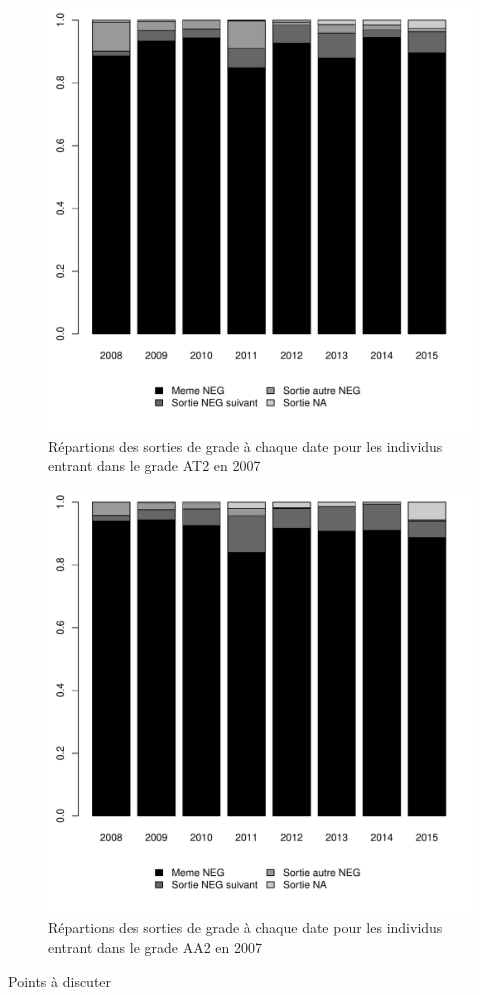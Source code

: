 \documentclass[11pt,a4paper]{article}
\begin{document}
\begin{figure}[ht] 
  \caption{Répartions des sorties de grade à chaque date pour les individus entrant dans le grade AT2 en 2007}
  \label{echelon_by_neg} 
    \includegraphics[width=1\linewidth]{destination_AT_1.pdf} 
\end{figure}


\begin{figure}[ht] 
  \caption{Répartions des sorties de grade à chaque date pour les individus entrant dans le grade AA2 en 2007}
  \label{echelon_by_neg} 
    \includegraphics[width=1\linewidth]{destination_AA_1.pdf} 
\end{figure}



\clearpage
Points à discuter
\end{document}
